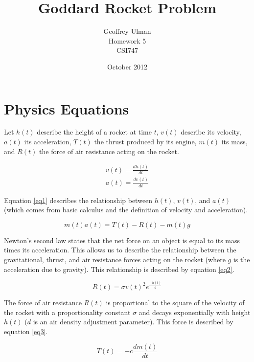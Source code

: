 \documentclass{article}
\begin{document}
\title{Goddard Rocket Problem}
\author{Geoffrey Ulman\\
        Homework 5\\
        CSI747}
\date{October 2012}
\maketitle

\section{Physics Equations}\label{Physics Equations}

Let \(h(t)\) describe the height of a rocket at time \(t\), \(v(t)\) describe its velocity, \(a(t)\) its acceleration, \(T(t)\) the thrust produced by its engine, \(m(t)\) its mass, and \(R(t)\) the force of air resistance acting on the rocket.

\begin{eqnarray}\label{eq1}
v(t) = \frac{dh(t)}{dt} \nonumber \\
a(t) = \frac{dv(t)}{dt}
\end{eqnarray}

Equation \ref{eq1} describes the relationship between \(h(t)\), \(v(t)\), and \(a(t)\) (which comes from basic calculus and the definition of velocity and acceleration).

\begin{equation}\label{eq2}
m(t)a(t) = T(t) - R(t) - m(t)g
\end{equation}

Newton's second law states that the net force on an object is equal to its mass times its acceleration. This allows us to describe the relationship between the gravitational, thrust, and air resistance forces acting on the rocket (where \(g\) is the acceleration due to gravity). This relationship is described by equation \ref{eq2}.

\begin{equation}\label{eq3}
R(t) = \sigma v(t)^2 e^{\frac{-h(t)}{d}}
\end{equation}

The force of air resistance \(R(t)\) is proportional to the square of the velocity of the rocket with a proportionality constant \(\sigma\) and decays exponentially with height \(h(t)\) (\(d\) is an air density adjustment parameter). This force is described by equation \ref{eq3}.

\begin{equation}\label{eq4}
T(t) = -c \frac{dm(t)}{dt}
\end{equation}
\end{document}
